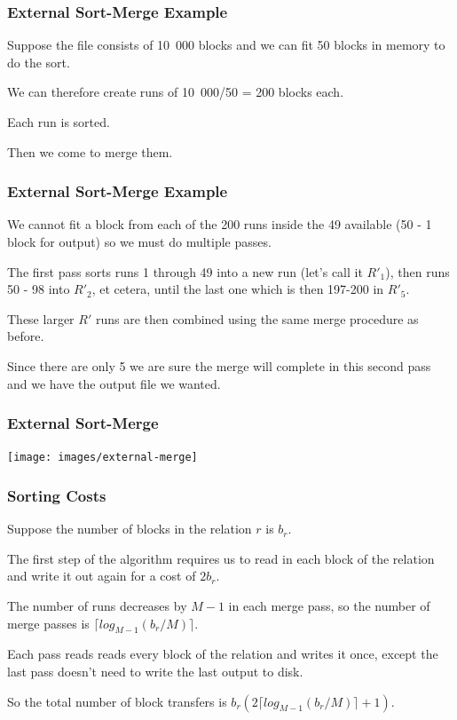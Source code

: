 \begin{frame}
\frametitle{External Sort-Merge Example}


Suppose the file consists of 10~000 blocks and we can fit 50 blocks in memory to do the sort. 

We can therefore create runs of 10~000/50 = 200 blocks each. 

Each run is sorted. 

Then we come to merge them. 

\end{frame}


\begin{frame}
\frametitle{External Sort-Merge Example}
We cannot fit a block from each of the 200 runs inside the 49 available (50 - 1 block for output) so we must do multiple passes. 

The first pass sorts runs 1 through 49 into a new run (let's call it $R'_{1}$), then runs 50 - 98 into $R'_{2}$, et cetera, until the last one which is then 197-200 in $R'_{5}$. 

These larger $R'$ runs are then combined using the same merge procedure as before. 

Since there are only 5 we are sure the merge will complete in this second pass and we have the output file we wanted.


\end{frame}

\begin{frame}
\frametitle{External Sort-Merge}

\begin{center}
	\texttt{[image: images/external-merge]}
\end{center}

\end{frame}

\begin{frame}
\frametitle{Sorting Costs}

Suppose the number of blocks in the relation $r$ is $b_{r}$.


The first step of the algorithm requires us to read in each block of the relation and write it out again for a cost of $2b_{r}$. 

The number of runs decreases by $M-1$ in each merge pass, so the number of merge passes is $\lceil log_{M-1}(b_{r}/M)\rceil$. 

Each pass reads reads every block of the relation and writes it once, except the last pass doesn't need to write the last output to disk. 

So the total number of block transfers is $b_{r}(2\lceil log_{M-1}(b_{r}/M)\rceil + 1)$. 

\end{frame}

